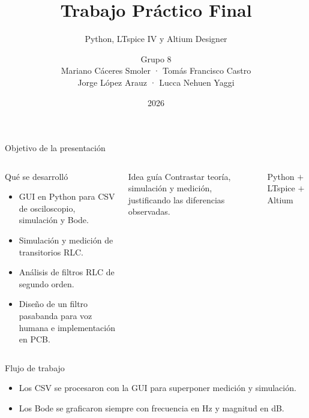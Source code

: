 \documentclass[aspectratio=169,11pt]{beamer}
\title{Trabajo Práctico Final}
\subtitle{Python, LTspice IV y Altium Designer}
\author{Grupo 8\\Mariano Cáceres Smoler · Tomás Francisco Castro\\Jorge López Arauz · Lucca Nehuen Yaggi}
\institute{Teoría de Circuitos I -- ITBA}
\date{2026}
\begin{document}
\begin{frame}[plain]
    \titlepage
\end{frame}

\begin{frame}{Objetivo de la presentación}
    \begin{columns}[T,onlytextwidth]
        \begin{block}{Qué se desarrolló}
        \begin{itemize}
            \item GUI en Python para CSV de osciloscopio, simulación y Bode.
            \item Simulación y medición de transitorios RLC.
            \item Análisis de filtros RLC de segundo orden.
            \item Diseño de un filtro pasabanda para voz humana e implementación en PCB.
        \end{itemize}
        \end{block}
        \begin{alertblock}{Idea guía}
        Contrastar teoría, simulación y medición, justificando las diferencias observadas.
        \end{alertblock}
        \vspace{0.4em}
        \begin{center}
        \Large Python $+$ LTspice $+$ Altium
        \end{center}
    \end{columns}
\end{frame}

\begin{frame}{Flujo de trabajo}
    \centering
    \vspace{1em}
    \begin{itemize}
        \item Los CSV se procesaron con la GUI para superponer medición y simulación.
        \item Los Bode se graficaron siempre con frecuencia en Hz y magnitud en dB.
    \end{itemize}
\end{frame}
\end{document}
